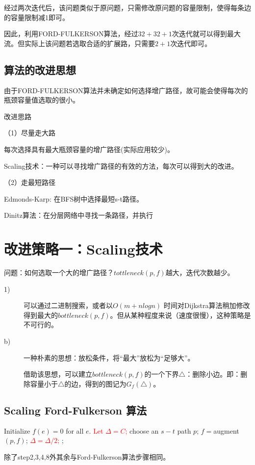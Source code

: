 经过两次迭代后，该问题类似于原问题，只需修改原问题的容量限制，使得每条边的容量限制减1即可。

因此，利用{\sc FORD-FULKERSON}算法，经过$32+32+1$次迭代就可以得到最大流。但实际上该问题若选取合适的扩展路，只需要$2+1$次迭代即可。

\subsection{算法的改进思想}
由于{\sc FORD-FULKERSON}算法并未确定如何选择增广路径，故可能会使得每次的瓶颈容量值选取的很小。

改进思路

（1）尽量走大路

每次选择具有最大瓶颈容量的增广路径(实际应用较少)。

Scaling技术：一种可以寻找增广路径的有效的方法，每次可以得到大的改进。

（2）走最短路径

Edmonds-Karp: 在BFS树中选择最短s-t路径。

Dinitz算法：在分层网络中寻找一条路径，并执行
\section{改进策略一：Scaling技术}
问题：如何选取一个大的增广路径？$tottleneck(p,f)$越大，迭代次数越少。
\begin{description}
\item[1)]
可以通过二进制搜索，或者以$O(m+nlogn)$ 时间对Dijkstra算法稍加修改得到最大的$bottleneck(p,f)$。但从某种程度来说（速度很慢），这种策略是不可行的。

\item[b)] 一种朴素的思想：放松条件，将“最大”放松为“足够大”。

借助该思想，可以建立$bottleneck(p,f)$的一个下界$\triangle$：删除小边。即：删除容量小于$\triangle$的边，得到的图记为$G_f(\triangle)$。

\end{description}
\subsection{Scaling {\sc Ford-Fulkerson} 算法}

  \begin{algorithmic}[1]
    \STATE Initialize $f(e)=0$ for all $e$.
    \STATE \textcolor{red}{ Let $\Delta = C$;}
    \WHILE{  \textcolor{red}{ $\Delta \geq 1$ } }
    \STATE choose an $s-t$ path $p$;
    \STATE $f = ${\sc augment}$(p,f)$;
    \ENDWHILE
    \STATE \textcolor{red}{$\Delta = \Delta / 2$;}
    \ENDWHILE
    ;
  \end{algorithmic}
除了step2,3,4,8外其余与{\sc Ford-Fulkerson}算法步骤相同。

